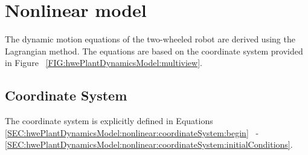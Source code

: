 \documentclass[crop=false,float=true,class=scrreprt]{standalone}
\begin{document}
\section{Nonlinear model}
\label{SEC:hwePlantDynamicsModel:nonlinear}

The dynamic motion equations of the two-wheeled robot are derived using the Lagrangian method.
The equations are based on the coordinate system provided in Figure~%
\ref{FIG:hwePlantDynamicsModel:multiview}.

\subsection{Coordinate System}
\label{SEC:hwePlantDynamicsModel:nonlinear:coordinateSystem}

The coordinate system is explicitly defined in Equations
\eqref{SEC:hwePlantDynamicsModel:nonlinear:coordinateSystem:begin}~%
-~%
\eqref{SEC:hwePlantDynamicsModel:nonlinear:coordinateSystem:initialConditions}.


\vspace*{-2em}
\end{document}
